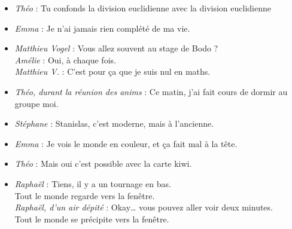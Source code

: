 \begin{itemize}
\item \textit{Théo} : \og Tu confonds la division euclidienne avec la division euclidienne \fg

\item \textit{Emma} : \og Je n'ai jamais rien complété de ma vie. \fg

\item \textit{Matthieu Vogel} : \og Vous allez souvent au stage de Bodo ? \fg \\
\textit{Amélie} : \og Oui, à chaque fois. \fg \\
\textit{Matthieu V.} : \og C'est pour ça que je suis nul en maths. \fg

\item \textit{Théo, durant la réunion des anims} : \og Ce matin, j'ai fait cours de dormir au groupe moi. \fg

\item \textit{Stéphane} : \og Stanislas, c'est moderne, mais à l'ancienne. \fg

\item \textit{Emma} : \og Je vois le monde en couleur, et ça fait mal à la tête. \fg

\item \textit{Théo} : \og Mais oui c'est possible avec la carte kiwi. \fg

\item \textit{Raphaël} : \og Tiens, il y a un tournage en bas. \fg \\
Tout le monde regarde vers la fenêtre. \\
\textit{Raphaël, d'un air dépité} : \og Okay… vous pouvez aller voir deux minutes. \fg \\
Tout le monde se précipite vers la fenêtre.



\end{itemize}